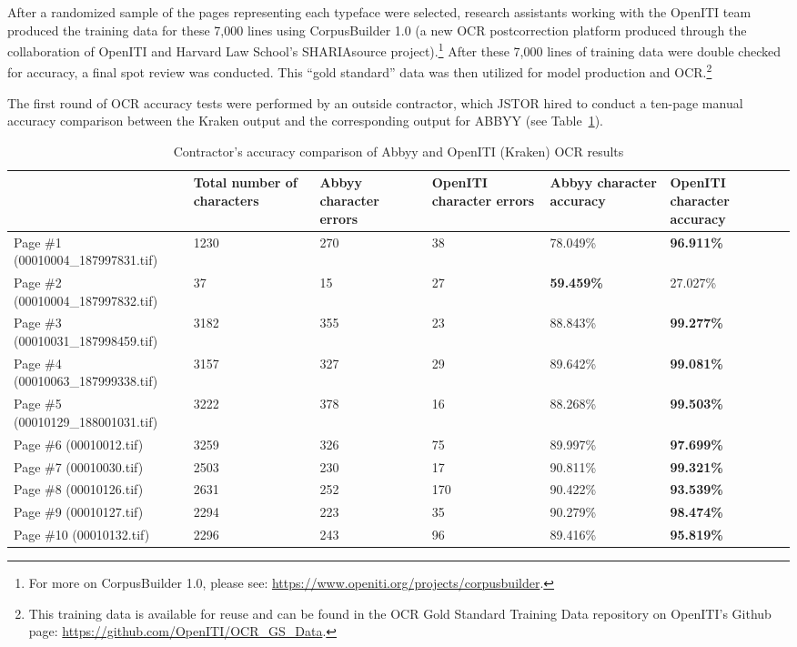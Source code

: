 After a randomized sample of the pages representing each typeface were
selected, research assistants working with the OpenITI team produced the
training data for these 7,000 lines using CorpusBuilder 1.0 (a new OCR
postcorrection platform produced through the collaboration of OpenITI and
Harvard Law School’s SHARIAsource project).\footnote{For more on CorpusBuilder
1.0, please see: \url{https://www.openiti.org/projects/corpusbuilder}.} After
these 7,000 lines of training data were double checked for accuracy, a final
spot review was conducted. This “gold standard” data was then utilized for
model production and OCR.\footnote{This training data is available for reuse
and can be found in the OCR Gold Standard Training Data repository on OpenITI’s
Github page: \url{https://github.com/OpenITI/OCR_GS_Data}.}

The first round of OCR accuracy tests were performed by an outside contractor,
which JSTOR hired to conduct a ten-page manual accuracy comparison between the
Kraken output and the corresponding output for ABBYY (see Table~\ref{tab_champs:table_1}).

\begin{table}[h!]
\begin{center}
\caption{Contractor's accuracy comparison of Abbyy and OpenITI (Kraken) OCR results}
\label{tab_champs:table_1}
	\begin{tabularx}{\textwidth}{p{2.7cm}p{1.7cm}p{1.7cm}p{1.7cm}p{1.7cm}p{1.7cm}} \toprule
& \textbf{Total number of characters} & \textbf{Abbyy character errors} & \textbf{OpenITI character errors} & \textbf{Abbyy character accuracy} & \textbf{OpenITI character accuracy}\\\midrule
Page \#1 \scriptsize{(00010004\_187997831.tif)} & 1230 & 270 & 38 & 78.049\% & \textbf{96.911\%} \\
Page \#2 \scriptsize{(00010004\_187997832.tif)} & 37& 15 & 27 & \textbf{59.459\%} & 27.027\%\\
Page \#3 \scriptsize{(00010031\_187998459.tif)} & 3182 & 355 & 23 & 88.843\% & \textbf{99.277\%}\\
Page \#4 \scriptsize{(00010063\_187999338.tif)} & 3157 & 327 & 29 & 89.642\% & \textbf{99.081\%}\\
Page \#5 \scriptsize{(00010129\_188001031.tif)} & 3222 & 378 & 16 & 88.268\% & \textbf{99.503\%}\\
Page \#6 \scriptsize{(00010012.tif)} & 3259 & 326 & 75 & 89.997\% & \textbf{97.699\%}\\
Page \#7 \scriptsize{(00010030.tif)} & 2503 & 230 & 17 & 90.811\% & \textbf{99.321\%}\\
Page \#8 \scriptsize{(00010126.tif)} & 2631 & 252 & 170 & 90.422\% & \textbf{93.539\%}\\
Page \#9 \scriptsize{(00010127.tif)} & 2294 & 223 & 35 & 90.279\% & \textbf{98.474\%}\\
Page \#10 \scriptsize{(00010132.tif)} & 2296 & 243 & 96 & 89.416\% & \textbf{95.819\%}\\
\bottomrule
\end{tabularx}
\end{center}
\end{table}

